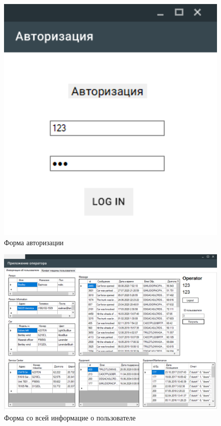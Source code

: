 \begin{figure}[H]
	\centering
	\includegraphics[scale=0.9]{img/auth.png}
	\caption{Форма авторизации}
	\label{img:auth}
\end{figure}

\begin{figure}[H]
	\centering
	\includegraphics[scale=0.5]{img/main_1.png}
	\caption{Форма со всей информацие о пользователе}
	\label{img:main_1}
\end{figure}

